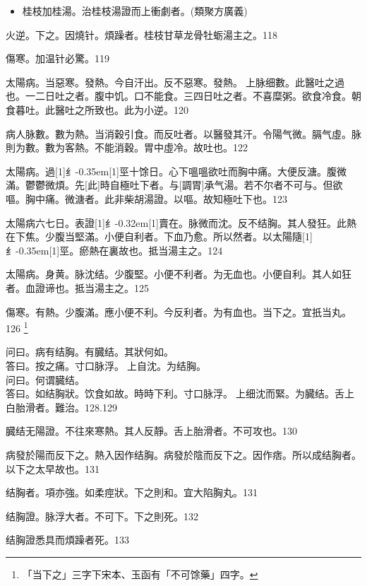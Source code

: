 \documentclass[oneside,b4paper]{ctexbook}
\begin{document}
\begin{flushleft}
\begin{itemize}
\item 桂枝加桂湯。治桂枝湯證而上衝劇者。(類聚方廣義)
\end{itemize}

火逆。下之。因燒针。煩躁者。桂枝甘草龙骨牡蛎湯主之。118

傷寒。加温针必驚。119

太陽病。当惡寒。發熱。今自汗出。反不惡寒。發熱。{𬮦}上脉细數。此醫吐之過也。一二日吐之者。腹中饥。口不能食。三四日吐之者。不喜糜粥。欲食冷食。朝食暮吐。此醫吐之所致也。此为小逆。120

病人脉數。數为熱。当消穀引食。而反吐者。以醫發其汗。令陽气微。膈气虛。脉則为數。數为客熱。不能消穀。胃中虛冷。故吐也。122

太陽病。過{\hbox{\scalebox{0.68}[1]{纟}\kern-0.35em\scalebox{0.64}[1]{巠}}}十馀日。心下嗢嗢欲吐而胸中痛。大便反溏。腹微滿。鬱鬱微煩。先[此]時自極吐下者。与[調胃]承气湯。若不尔者不可与。但欲嘔。胸中痛。微溏者。此非柴胡湯證。以嘔。故知極吐下也。123

太陽病六七日。表證{\hbox{\scalebox{0.6}[1]{纟}\kern-0.32em\scalebox{0.7}[1]{賣}}}在。脉微而沈。反不结胸。其人發狂。此熱在下焦。少腹当堅滿。小便自利者。下血乃愈。所以然者。以太陽隨{\hbox{\scalebox{0.68}[1]{纟}\kern-0.35em\scalebox{0.64}[1]{巠}}}。瘀熱在裏故也。抵当湯主之。124

太陽病。身黄。脉沈结。少腹堅。小便不利者。为无血也。小便自利。其人如狂者。血證谛也。抵当湯主之。125

傷寒。有熱。少腹滿。應小便不利。今反利者。为有血也。当下之。宜扺当丸。126
\footnote{「当下之」三字下宋本、玉函有「不可馀藥」四字。}

问曰。病有结胸。有臓结。其狀何如。\\
答曰。按之痛。寸口脉浮。{𬮦}上自沈。为结胸。\\
问曰。何谓臓结。\\
答曰。如结胸狀。饮食如故。時時下利。寸口脉浮。{𬮦}上细沈而緊。为臓结。舌上白胎滑者。難治。128.129

臓结无陽證。不往來寒熱。其人反靜。舌上胎滑者。不可攻也。130

病發於陽而反下之。熱入因作结胸。病發於陰而反下之。因作痞。所以成结胸者。以下之太早故也。131

结胸者。項亦強。如柔痙狀。下之則和。宜大陷胸丸。131

结胸證。脉浮大者。不可下。下之則死。132

结胸證悉具而煩躁者死。133


\end{flushleft}
\end{document}

